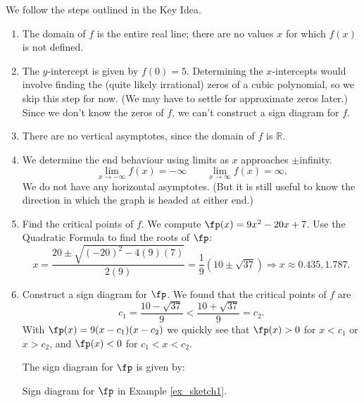 {We follow the steps outlined in the Key Idea.
\begin{enumerate}
\item		The domain of $f$ is the entire real line; there are no values $x$ for which $f(x)$ is not defined.
\item		The $y$-intercept is given by $f(0)=5$. Determining the $x$-intercepts would involve finding the (quite likely irrational) zeros of a cubic polynomial, so we skip this step for now. (We may have to settle for approximate zeros later.) Since we don't know the zeros of $f$, we can't construct a sign diagram for $f$.
\item		There are no vertical asymptotes, since the domain of $f$ is $\mathbb{R}$.
\item		We determine the end behaviour using limits as $x$ approaches $\pm$infinity.				
\[
\lim_{x\to -\infty} f(x) = -\infty \qquad \lim_{x\to \infty}f(x) = \infty.
\]
			We do not have any horizontal asymptotes. (But it is still useful to know the direction in which the graph is headed at either end.)

\item		Find the critical points of $f$. We compute $\fp(x) = 9x^2-20x+7$. Use the Quadratic Formula to find the roots of $\fp$:
\[
x = \frac{20\pm \sqrt{(-20)^2-4(9)(7)}}{2(9)} = \frac19\left(10\pm\sqrt{37}\right) \Rightarrow x\approx 0.435, 1.787.
\]
\item 		Construct a sign diagram for $\fp$. We found that the critical points of $f$ are 
\[
c_1 = \frac{10-\sqrt{37}}{9} < \frac{10+\sqrt{37}}{9} = c_2.
\]
With $\fp(x) = 9(x-c_1)(x-c_2)$ we quickly see that $\fp(x)>0$ for $x<c_1$ or $x>c_2$, and $\fp(x)<0$ for $c_1<x<c_2$.

\pagebreak

The sign diagram for $\fp$ is given by:

\noindent\begin{minipage}{\textwidth}
\begin{center}
\end{center}
\captionsetup{type=figure}%
			\caption{Sign diagram for $\fp$ in Example \ref{ex_sketch1}.}\label{fig:sketchline1fp}
\end{minipage}\\


\end{enumerate}}
